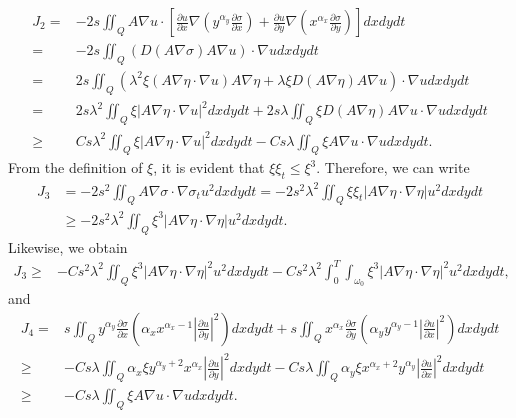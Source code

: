 \documentclass[9pt,reqno]{amsart}
\theoremstyle{plain}
\numberwithin{equation}{section}
\numberwithin{theorem}{section}
\begin{document}
	\begin{equation}\label{J2}
		\begin{aligned}
			J_2 =&-2s  \iint_{Q} A\nabla u \cdot \left[ \frac{\partial u}{\partial x} \nabla (y^{\alpha_y} \frac{\partial \sigma}{\partial x}) + \frac{\partial u}{\partial y} \nabla (x^{\alpha_x} \frac{\partial \sigma}{\partial y}) \right]  dx dy dt\\
			=&-2s \iint_{Q}( D(A\nabla \sigma) A\nabla u) \cdot \nabla u dx dy dt\\
			=&2s \iint_{Q}( \lambda^2 \xi (A\nabla \eta \cdot \nabla u) A\nabla \eta + \lambda \xi D(A\nabla \eta) A\nabla u ) \cdot \nabla u dx dy dt\\
			=&2s \lambda^2\iint_{Q}  \xi \left|  A\nabla \eta \cdot \nabla u \right| ^2 dx dy dt  + 2s\lambda \iint_{Q}\xi D(A\nabla \eta) A\nabla u  \cdot \nabla u dx dy dt\\
			\ge& Cs \lambda^2\iint_{Q}  \xi \left|  A\nabla \eta \cdot \nabla u \right| ^2 dx dy dt  - C s\lambda \iint_{Q}\xi A\nabla u  \cdot \nabla u dx dy dt.
		\end{aligned}
	\end{equation}
	From the definition of $\xi$, it is evident that $\xi \xi_t \le \xi^3$. Therefore, we can write
	\begin{equation*}
		\begin{aligned}
			J_3 &=-2 s^2 \iint_{Q} A\nabla \sigma \cdot \nabla \sigma_t u^2 dx dydt
			=-2 s^2 \lambda^2 \iint_{Q} \xi \xi_t \left|A \nabla \eta \cdot \nabla \eta \right|  u^2 dx dydt\\
			&\ge-2 s^2 \lambda^2 \iint_{Q} \xi^3 \left|A \nabla \eta \cdot \nabla \eta \right|  u^2 dx dydt.
		\end{aligned}
	\end{equation*}
	Likewise, we obtain
	\begin{equation}\label{J3}
		\begin{aligned}
			J_3
			\ge &-C s^2 \lambda^2 \iint_{Q} \xi^3 \left|A \nabla \eta \cdot \nabla \eta \right|^2  u^2 dx dydt -C s^2 \lambda^2 \int_{0}^{T}\int_{\omega_0} \xi^3 \left|A \nabla \eta \cdot \nabla \eta \right|^2  u^2 dx dydt,
		\end{aligned}
	\end{equation}
	and
	\begin{equation}\label{J4}
		\begin{aligned}
			J_4 =&s\iint_{Q} y^{\alpha_y} \frac{\partial \sigma}{\partial x} \left( \alpha_x x^{\alpha_x-1}\left| \frac{\partial u}{\partial y}\right| ^2\right)  dx dydt
			+ s\iint_{Q} x^{\alpha_x} \frac{\partial \sigma}{\partial y} \left( \alpha_y y^{\alpha_y-1}\left| \frac{\partial u}{\partial x}\right| ^2\right)  dx dydt\\
			\ge  & -Cs \lambda \iint_Q \alpha_x \xi y^{\alpha_y+2}  x^{\alpha_x } \left| \frac{\partial u}{\partial y}\right|^2  dx dy dt 
			-Cs \lambda \iint_Q \alpha_y \xi x^{\alpha_x +2}  y^{\alpha_y } \left| \frac{\partial u}{\partial x}\right|^2  dx dy dt \\
			\ge & -C s \lambda \iint_Q  \xi A \nabla u \cdot \nabla u dx dy dt.
		\end{aligned}
	\end{equation}
\end{document}
